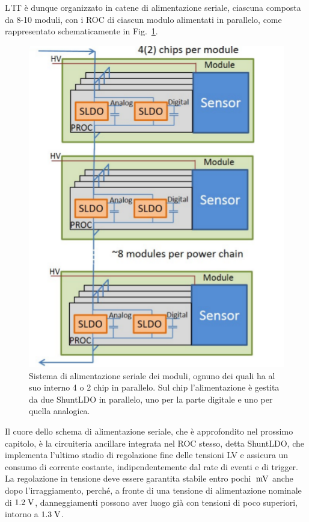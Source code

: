 L'IT \`e dunque organizzato in catene di alimentazione seriale, ciascuna composta da 8-10 moduli, con i ROC di ciascun modulo alimentati in parallelo, come rappresentato schematicamente in Fig.~\ref{serial}. 
\begin{figure}
\centering
\includegraphics[scale=0.4]{Immagini/serial}
\caption{Sistema di alimentazione seriale dei moduli, ognuno dei quali ha al suo interno 4 o 2 chip in parallelo. Sul chip l'alimentazione è gestita da due ShuntLDO in parallelo, uno per la parte digitale e uno per quella analogica.}
\label{serial}
\end{figure}
Il cuore dello schema di alimentazione seriale, che \`e approfondito nel prossimo capitolo, \`e la circuiteria ancillare integrata nel ROC stesso, detta ShuntLDO, che implementa l'ultimo stadio di regolazione fine delle tensioni LV e assicura un consumo di corrente costante, indipendentemente dal rate di eventi e di trigger. La regolazione in tensione deve essere garantita stabile entro pochi $\rm \; mV$ anche dopo l'irraggiamento, perch\'e, a fronte di una tensione di alimentazione nominale di $1.2\rm \; V$, danneggiamenti possono aver luogo gi\`a con tensioni di poco superiori, intorno a $1.3\rm \; V$.

